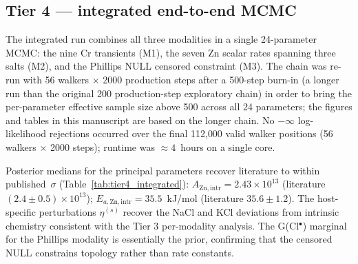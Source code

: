 \documentclass[12pt]{article}
\theoremstyle{plain}
\theoremstyle{definition}
\theoremstyle{remark}
\begin{document}
\subsection{Tier 4 --- integrated end-to-end MCMC}\label{sec:val:tier4}

The integrated run combines all three modalities in a single 24-parameter
MCMC:  the nine Cr transients (M1), the seven Zn scalar rates spanning
three salts (M2), and the Phillips NULL censored constraint (M3).  The
chain was re-run with 56 walkers $\times$ 2000 production steps after a
500-step burn-in (a longer run than the original 200 production-step
exploratory chain) in order to bring the per-parameter effective sample
size above 500 across all 24 parameters; the figures and tables in this
manuscript are based on the longer chain.  No $-\infty$ log-likelihood
rejections occurred over the final 112{,}000 valid walker positions
(56 walkers $\times$ 2000 steps); runtime was $\approx 4$~hours on a single
core.

Posterior medians for the principal parameters recover literature to
within published~$\sigma$ (Table~\ref{tab:tier4_integrated}):
$A_{\mathrm{Zn,intr}} = 2.43\times 10^{13}$ (literature
$(2.4\pm 0.5)\times 10^{13}$);
$E_{a,\mathrm{Zn,intr}} = 35.5$~kJ/mol (literature $35.6\pm 1.2$).  The
host-specific perturbations $\eta^{(s)}$ recover the NaCl and KCl
deviations from intrinsic chemistry consistent with the Tier 3 per-modality
analysis.  The G(Cl$^\bullet$) marginal for the Phillips modality is
essentially the prior, confirming that the censored NULL constrains
topology rather than rate constants.
\end{document}
